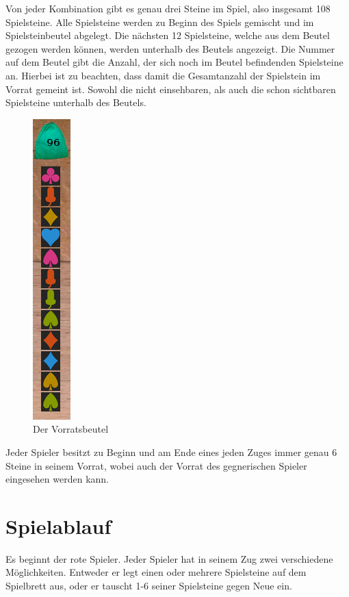 \documentclass[a4paper, ngerman]{scrartcl}
\begin{document}
Von jeder Kombination gibt es genau drei Steine im Spiel, also insgesamt 108 Spielsteine. Alle Spielsteine werden zu Beginn des Spiels gemischt und im Spielsteinbeutel abgelegt. Die nächsten 12 Spielsteine, welche aus dem Beutel gezogen werden können, werden unterhalb des Beutels angezeigt. Die Nummer auf dem Beutel gibt die Anzahl, der sich noch im Beutel befindenden Spielsteine an. Hierbei ist zu beachten, dass damit die Gesamtanzahl der Spielstein im Vorrat gemeint ist. Sowohl die nicht einsehbaren, als auch die schon sichtbaren Spielsteine unterhalb des Beutels.\\

\begin{figure}[h] \centering 
	\includegraphics[scale = 0.7]{images/Vorratsbeutel}
	\caption{Der Vorratsbeutel}
	\label{fig:Vorratsbeutel}
\end{figure}
Jeder Spieler besitzt zu Beginn und am Ende eines jeden Zuges immer genau 6 Steine in seinem Vorrat, wobei auch der Vorrat des gegnerischen Spieler eingesehen werden kann.\\


\section{Spielablauf}		
	Es beginnt der rote Spieler. Jeder Spieler hat in seinem Zug zwei verschiedene Möglichkeiten. Entweder er legt einen oder mehrere Spielsteine auf dem Spielbrett aus, oder er tauscht 1-6 seiner Spielsteine gegen Neue ein.	
	
\end{document}
